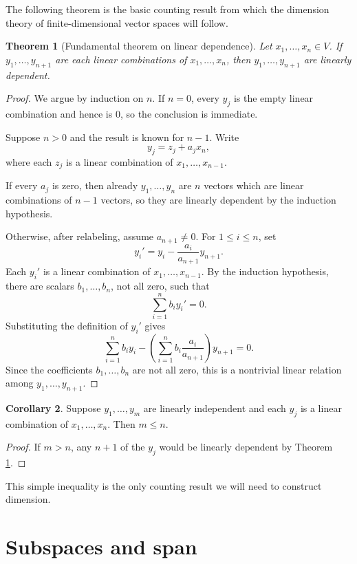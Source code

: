 \documentclass{amsbook}
\newtheorem{theorem}{Theorem}[chapter]
\theoremstyle{definition}
\newtheorem{corollary}[theorem]{Corollary}
\theoremstyle{remark}
\numberwithin{section}{chapter}
\numberwithin{equation}{chapter}
\begin{document}
The following theorem is the basic counting result from which the dimension theory of finite-dimensional vector spaces will follow.

\begin{theorem}[Fundamental theorem on linear dependence]\label{thm:fundamental-dependence}
	Let $x_1,\dots,x_n\in V$. If $y_1,\dots,y_{n+1}$ are each linear combinations of $x_1,\dots,x_n$, then $y_1,\dots,y_{n+1}$ are linearly dependent.
\end{theorem}

\begin{proof}
	We argue by induction on $n$. If $n=0$, every $y_j$ is the empty linear combination and hence is $0$, so the conclusion is immediate.

	Suppose $n>0$ and the result is known for $n-1$. Write
	\[
	y_j=z_j+a_jx_n,
	\]
	where each $z_j$ is a linear combination of $x_1,\dots,x_{n-1}$.

	If every $a_j$ is zero, then already $y_1,\dots,y_n$ are $n$ vectors which are linear combinations of $n-1$ vectors, so they are linearly dependent by the induction hypothesis.

	Otherwise, after relabeling, assume $a_{n+1}\neq0$. For $1\le i\le n$, set
	\[
	y_i'=y_i-\frac{a_i}{a_{n+1}}y_{n+1}.
	\]
	Each $y_i'$ is a linear combination of $x_1,\dots,x_{n-1}$. By the induction hypothesis, there are scalars $b_1,\dots,b_n$, not all zero, such that
	\[
	\sum_{i=1}^n b_i y_i'=0.
	\]
	Substituting the definition of $y_i'$ gives
	\[
	\sum_{i=1}^n b_i y_i
	-\left(\sum_{i=1}^n b_i\frac{a_i}{a_{n+1}}\right)y_{n+1}=0.
	\]
	Since the coefficients $b_1,\dots,b_n$ are not all zero, this is a nontrivial linear relation among $y_1,\dots,y_{n+1}$.
\end{proof}

\begin{corollary}\label{cor:independent-vs-generators}
	Suppose $y_1,\dots,y_m$ are linearly independent and each $y_j$ is a linear combination of $x_1,\dots,x_n$. Then $m\le n$.
\end{corollary}

\begin{proof}
	If $m>n$, any $n+1$ of the $y_j$ would be linearly dependent by Theorem \ref{thm:fundamental-dependence}.
\end{proof}

This simple inequality is the only counting result we will need to construct dimension.

\section{Subspaces and span}\label{sec:subspace}
\end{document}
